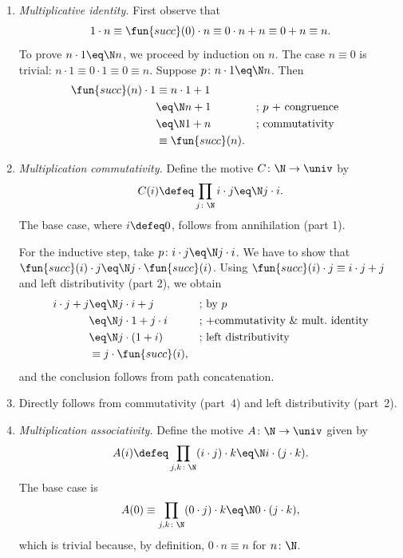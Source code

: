 \begin{solution}
\begin{enumerate}[a)]
\begin{enumerate}[1.]
            \item \textit{Multiplicative identity.} First observe that
            \[
                1\cdot n\equiv\fun{succ}(0)\cdot n\equiv 0\cdot n+n
                    \equiv 0+n\equiv n.
            \]
            To prove $n\cdot1\eq\N n$, we proceed by induction on $n$. The case $n\equiv0$ is trivial: $n\cdot1\equiv0\cdot1\equiv 0\equiv n$.
            Suppose $p\colon n\cdot1\eq\N n$. Then
            \begin{align*}
                \fun{succ}(n)\cdot1&\equiv n\cdot1+1\\
                    &\eq\N n+1
                        &&\text{; $p$ + congruence}\\
                    &\eq\N 1+n
                        &&\text{; commutativity}\\
                    &\equiv\fun{succ}(n).
            \end{align*}

            \item \textit{Multiplication commutativity.} Define the motive $C\colon\N\to\univ$ by
            \[
                C(i)\defeq\prod_{j\colon\N}i\cdot j\eq\N j\cdot i.
            \]
            The base case, where $i\defeq0$, follows from annihilation (part 1). 

            For the inductive step, take $p\colon i\cdot j\eq\N j\cdot i$. We have to show that $\fun{succ}(i)\cdot j\eq\N j\cdot\fun{succ}(i)$. Using $\fun{succ}(i)\cdot j\equiv i\cdot j+j$ and left distributivity (part 2), we obtain
            \begin{align*}
                i\cdot j+j &\eq\N j\cdot i+j
                        &&\text{; by }p\\
                    &\eq\N j\cdot1+j\cdot i
                        &&\text{; +commutativity \& mult.~identity}\\
                    &\eq\N j\cdot(1+i)
                        &&\text{; left distributivity}\\
                    &\equiv j\cdot\fun{succ}(i),
            \end{align*}
            and the conclusion follows from path concatenation.
            
            \item {} Directly follows from commutativity (part~4) and left distributivity (part~2).
            
            \item \textit{Multiplication associativity.} Define the motive $A\colon\N\to\univ$ given by
            \[
                A(i)\defeq\prod_{j,k\colon\N}(i\cdot j)\cdot k \eq\N i\cdot(j\cdot k).
            \]
            The base case is
            \[
                A(0)\equiv\prod_{j,k\colon\N}
                    (0\cdot j)\cdot k\eq\N 0\cdot(j\cdot k),
            \]
            which is trivial because, by definition, $0\cdot n\equiv n$ for $n\colon\N$.


\end{enumerate}
\end{enumerate}
\end{solution}
